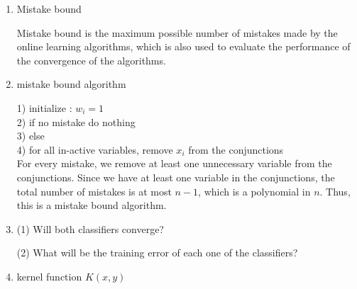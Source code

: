 \begin{enumerate}
\item Mistake bound

Mistake bound is the maximum possible number of mistakes made by the online learning algorithms, which is also used to evaluate the performance of the convergence of the algorithms. 

\item mistake bound algorithm

1) initialize : $w_i = 1$ \\
2) if no mistake do nothing \\
3) else \\
4)    for all in-active variables, remove $x_i$ from the conjunctions \\ 

For every mistake, we remove at least one unnecessary variable from the conjunctions. Since we have at least one variable in the conjunctions, the total number of mistakes is at most $n-1$, which is a polynomial in $n$. Thus, this  is a mistake bound algorithm.

\item 

(1) Will both classifiers converge?

(2) What will be the training error of each one of the classifiers?

\item kernel function $K(x, y)$

\end{enumerate}

